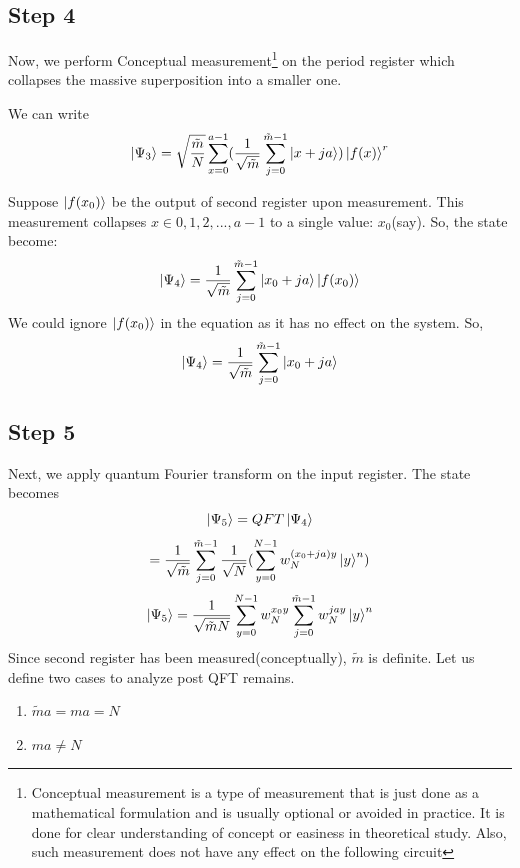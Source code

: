 \subsection{Step 4}
Now, we perform Conceptual measurement\footnote{Conceptual measurement is a type of measurement that is just done as a mathematical formulation and is usually optional or avoided in practice. It is done for clear understanding of concept or easiness in theoretical study. Also, such measurement does not have any effect on the following circuit} on the period register which collapses the massive superposition into a smaller one. 

We can write \begin{equation*}
    \ket{\Psi_3} = \sqrt{\frac{\Tilde{m}}{N}} \sum_{x=0}^{a-1} (\frac{1}{\sqrt{\Tilde{m}}} \sum_{j=0}^{\Tilde{m} - 1} \ket{x +j a} ) \ket{f(x)}^r
\end{equation*} 

Suppose $\ket{f(x_0)}$ be the output of second register upon measurement. This measurement collapses $x \in {0, 1, 2, . . ., a-1}$ to a single value: $x_0$(say). So, the state become:
\begin{equation*}
    \ket{\Psi_4} = \frac{1}{\sqrt{\Tilde{m}}} \sum_{j=0}^{\Tilde{m} - 1} \ket{x_0 + j a} \ket{f(x_0)}
\end{equation*}
We could ignore $\ket{f(x_0)} $ in the equation as it has no effect on the system. So,
\begin{equation}
    \ket{\Psi_4} =\frac{1}{\sqrt{\Tilde{m}}} \sum_{j=0}^{\Tilde{m} - 1} \ket{x_0 + j a}
\end{equation}



\subsection{Step 5}
Next, we apply quantum Fourier transform on the input register. The state becomes
\begin{equation*}
    \ket{\Psi_5} = QFT \ket{\Psi_4}
    \end{equation*}
\begin{equation*}
                 = \frac{1}{\sqrt{\Tilde{m}}} \sum_{j=0} ^{\Tilde{m} - 1} \frac{1}{\sqrt{N}} ( \sum_{y=0} ^{N-1} w_N ^{(x_0 + j a)y} \ket{y}^n ) 
\end{equation*}
\begin{equation}
    \ket{\Psi_5}   = \frac{1}{\sqrt{\Tilde{m} N}} \sum_{y=0} ^{N-1} w_N ^{x_0 y} \sum_{j=0} ^ {\Tilde{m} - 1} w_N ^{j a y} \ket{y}^n 
    \label{eq: post_QFT}
    \end{equation}
Since second register has been measured(conceptually), $\tilde{m}$ is definite.
Let us define two cases to analyze post QFT remains.
\begin{enumerate}
 \item $\tilde{m}a =  ma = N$
 \item $ma \neq N$
\end{enumerate}
